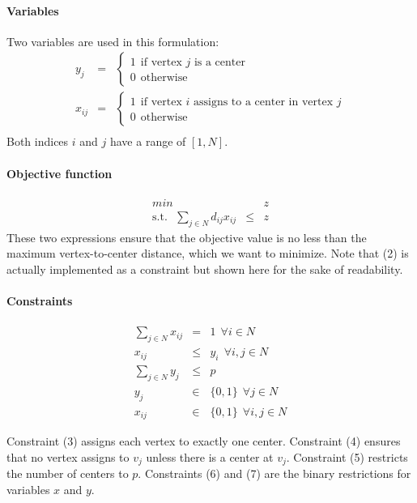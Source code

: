 \documentclass[a4paper,10pt]{article}
\begin{document}
	\paragraph{Variables} Two variables are used in this formulation:
	\begin{eqnarray*}
		y_j &=& \begin{cases}
 				1 ~~\text{if vertex $j$ is a center} \\
 				0 ~~\text{otherwise}
 			\end{cases} \\
 		x_{ij} &=& \begin{cases}
 				1 ~~\text{if vertex $i$ assigns to a center in vertex $j$} \\
 				0 ~~\text{otherwise}
 			\end{cases} \\
	\end{eqnarray*}
	Both indices $i$ and $j$ have a range of $[1, N]$.
	
	\paragraph{Objective function}
	\begin{eqnarray}
		min && z\\
		\text{s.t.}~~~ \sum_{j \in N} d_{ij} x_{ij} &\leq& z \label{eq:2}
	\end{eqnarray}
	These two expressions ensure that the objective value is no less than the maximum vertex-to-center distance, which we want to minimize. Note that (2) is actually implemented as a constraint but shown here for the sake of readability.
	
	\paragraph{Constraints}
	\begin{eqnarray}
		\sum_{j \in N} x_{ij} &=& 1 ~~\forall i \in N \\
		x_{ij} &\leq& y_i ~~\forall i,j \in N \\
		\sum_{j \in N} y_j &\leq& p \\
		y_j &\in& \{ 0,1 \} ~~\forall j \in N \\
		x_{ij} &\in& \{0 , 1 \} ~~\forall i,j \in N 
	\end{eqnarray}
	
	Constraint (3) assigns each vertex to exactly one center.
	Constraint (4) ensures that no vertex assigns to $v_j$ unless there is a center at $v_j$. 
	Constraint (5) restricts the number of centers to $p$.
	Constraints (6) and (7) are the binary restrictions for variables $x$ and $y$.     
    
\end{document}
